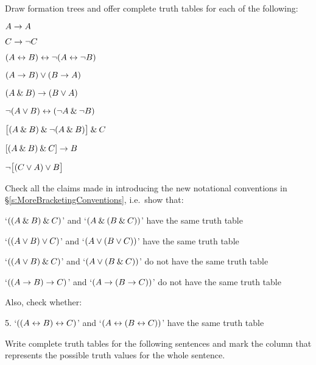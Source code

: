 \practiceproblems\label{pr.TT.TTorC}
\problempart
Draw formation trees and offer complete truth tables for each of the following:
\begin{earg}
\item $A \rightarrow A$ %
\item $C \rightarrow\neg C$ %
\item $(A \leftrightarrow B) \leftrightarrow \neg(A\leftrightarrow \neg B)$ %
\item $(A \rightarrow B) \vee (B \rightarrow A)$ %
\item $(A \mathbin{\&} B) \rightarrow (B \vee A)$  %
\item $\neg(A \vee B) \leftrightarrow (\neg A \mathbin{\&} \neg B)$ %
\item $\bigl[(A\mathbin{\&} B) \mathbin{\&}\neg(A\mathbin{\&} B)\bigr] \mathbin{\&} C$ %
\item $[(A \mathbin{\&} B) \mathbin{\&} C] \rightarrow B$ %
\item $\neg\bigl[(C\vee A) \vee B\bigr]$ %
\end{earg}
\problempart
Check all the claims made in introducing the new notational conventions in \S\ref{s:MoreBracketingConventions}, i.e.\ show that:
\begin{earg}
	\item `$((A \mathbin{\&} B) \mathbin{\&} C)$' and `$(A \mathbin{\&} (B \mathbin{\&} C))$' have the same truth table
	\item `$((A \vee B) \vee C)$' and `$(A \vee (B \vee C))$' have the same truth table
	\item `$((A \vee B) \mathbin{\&} C)$' and `$(A \vee (B \mathbin{\&} C))$' do not have the same truth table
	\item `$((A \rightarrow B) \rightarrow C)$' and `$(A \rightarrow (B \rightarrow C))$' do not have the same truth table
\end{earg}
Also, check whether:
\begin{earg}
	\item[5.] `$((A \leftrightarrow B) \leftrightarrow C)$' and `$(A \leftrightarrow (B \leftrightarrow C))$' have the same truth table
\end{earg}

\problempart
Write complete truth tables for the following sentences and mark the column that represents the possible truth values for the whole sentence.

